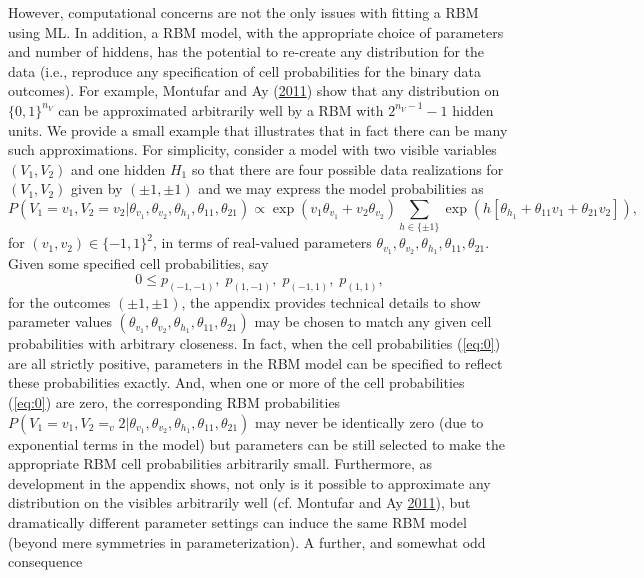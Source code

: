\documentclass[12pt]{article}
\theoremstyle{definition}
\newcommand{\nv}{{n_{\scriptscriptstyle V}}}
\begin{document}
However, computational concerns are not the only issues with fitting a
RBM using ML. In addition, a RBM model, with the appropriate choice of
parameters and number of hiddens, has the potential to re-create any
distribution for the data (i.e., reproduce any specification of cell
probabilities for the binary data outcomes). For example, Montufar and
Ay (\protect\hyperlink{ref-montufar2011refinements}{2011}) show that any
distribution on \(\{0, 1\}^{\nv}\) can be approximated arbitrarily well
by a RBM with \(2^{\nv-1} - 1\) hidden units. We provide a small example
that illustrates that in fact there can be many such approximations. For
simplicity, consider a model with two visible variables \((V_1,V_2)\)
and one hidden \(H_1\) so that there are four possible data realizations
for \((V_1,V_2)\) given by \((\pm 1, \pm 1)\) and we may express the
model probabilities as \[
P(V_1=v_1,V_2=v_2| \theta_{v_1}, \theta_{v_2}, \theta_{h_1}, \theta_{11},\theta_{21}) \propto  \exp\left( v_1  \theta_{v_1} + v_2 \theta_{v_2}\right) \sum_{h \in \{\pm 1\}}\exp\left( h[ \theta_{h_1}  + \theta_{11} v_1 + \theta_{21} v_2] \right),
\] for \((v_1,v_2)\in \{-1, 1\}^2\), in terms of real-valued parameters
\(\theta_{v_1}, \theta_{v_2}, \theta_{h_1}, \theta_{11},\theta_{21}\).
Given some specified cell probabilities, say
\begin{equation}
\label{eq:0}
0\leq p_{(-1,-1)},\;p_{(1,-1)}, \;p_{(-1,1)},\;p_{(1,1)},
\end{equation}
for the outcomes \((\pm 1, \pm 1)\), the appendix provides technical
details to show parameter values
\((\theta_{v_1}, \theta_{v_2}, \theta_{h_1}, \theta_{11},\theta_{21})\)
may be chosen to match any given cell probabilities with arbitrary
closeness. In fact, when the cell probabilities (\eqref{eq:0}) are all
strictly positive, parameters in the RBM model can be specified to
reflect these probabilities exactly. And, when one or more of the cell
probabilities (\eqref{eq:0}) are zero, the corresponding RBM probabilities
\(P(V_1=v_1,V_2=_v2| \theta_{v_1}, \theta_{v_2}, \theta_{h_1}, \theta_{11},\theta_{21})\)
may never be identically zero (due to exponential terms in the model)
but parameters can be still selected to make the appropriate RBM cell
probabilities arbitrarily small. Furthermore, as development in the
appendix shows, not only is it possible to approximate any distribution
on the visibles arbitrarily well (cf. Montufar and Ay
\protect\hyperlink{ref-montufar2011refinements}{2011}), but dramatically
different parameter settings can induce the same RBM model (beyond mere
symmetries in parameterization). A further, and somewhat odd consequence
\end{document}
